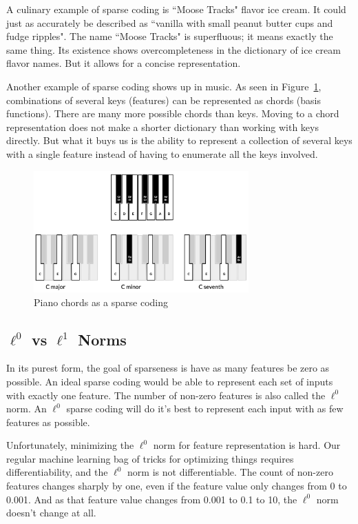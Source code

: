 A culinary example of sparse coding is ``Moose Tracks" flavor ice cream.
It could just as accurately be described as ``vanilla with small
peanut butter cups and fudge ripples". The name ``Moose Tracks" is
superfluous; it means exactly the same thing.
Its existence shows overcompleteness in the dictionary
of ice cream flavor names. But it allows for a concise representation.

Another example of sparse coding shows up in music. As seen in
Figure~\ref{fig:chords}, combinations of several keys (features)
can be represented as chords (basis functions). There are many more
possible chords than keys. Moving to a chord representation does not
make a shorter dictionary than working with keys directly. But what
it buys us is the ability to represent a collection of several keys with
a single feature instead of having to enumerate all the keys involved. 

\begin{figure}[ht]
\vskip 0.2in
\begin{center}
\centerline{\includegraphics[width=3.25in]{images/chords.png}}
\caption{Piano chords as a sparse coding}
\label{fig:chords}
\end{center}
\vskip -0.2in
\end{figure}

\subsection{$\ell^0$ vs $\ell^1$ Norms}
\label{subsec:sparsenorms}

In its purest form, the goal of sparseness is have as many features be
zero as possible. An ideal sparse coding would be able to represent each
set of inputs with exactly one feature. The number of non-zero features
is also called the $\ell^0$ norm. An $\ell^0$ sparse coding will
do it's best to represent each input with as few features as possible.

Unfortunately, minimizing the $\ell^0$ norm for feature representation is hard.
Our regular machine learning bag of tricks for optimizing things
requires differentiability, and the $\ell^0$ norm is not differentiable. The
count of non-zero features changes sharply by one, even if the feature
value only changes from 0 to 0.001. And as that feature value changes from
0.001 to 0.1 to 10, the $\ell^0$ norm doesn't change at all.

